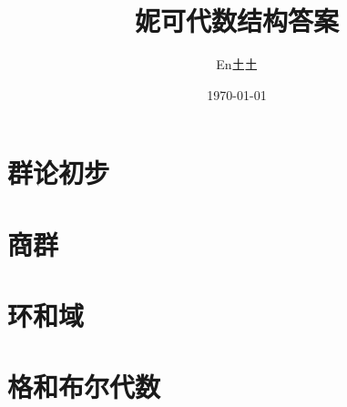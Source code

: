 \documentclass[UTF8]{ctexart}
\title{妮可代数结构答案}
\author{En土土}
\date{\today}
\begin{document}
\fancyfoot[C]{\thepage}

\maketitle
\tableofcontents
\newpage


\newpage


\newpage


\newpage


\newpage

\section{群论初步}

\newpage

\section{商群}

\newpage

\section{环和域}

\newpage

\section{格和布尔代数}
\end{document}
